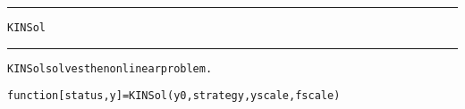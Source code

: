 \begin{samepage}
\hrule
\begin{center}
{\large \verb!KINSol!}
\label{p:KINSol}
\end{center}
\hrule\vspace{0.1in}



\begin{alltt}
KINSol solves the nonlinear problem.
\end{alltt}

\end{samepage}



\begin{samepage}


\begin{alltt}
function [status,y] = KINSol(y0, strategy, yscale, fscale) 
\end{alltt}

\end{samepage}



